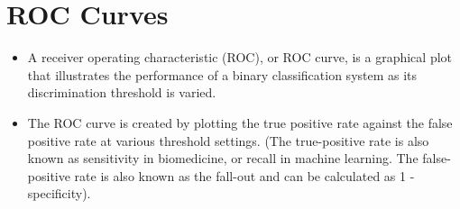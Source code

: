 \documentclass[a4paper,12pt]{article}
\begin{document}
\section*{ROC Curves}
\begin{itemize}
	\item  A receiver operating characteristic (ROC), or ROC curve, is a graphical plot that illustrates
	the performance of a binary classification system as its discrimination threshold is varied.
	\item  The ROC curve is created by plotting the true positive rate against the false positive rate at
	various threshold settings. (The true-positive rate is also known as sensitivity in biomedicine,
	or recall in machine learning. The false-positive rate is also known as the fall-out and can be
	calculated as 1 - specificity).

\end{itemize}
\end{document}
